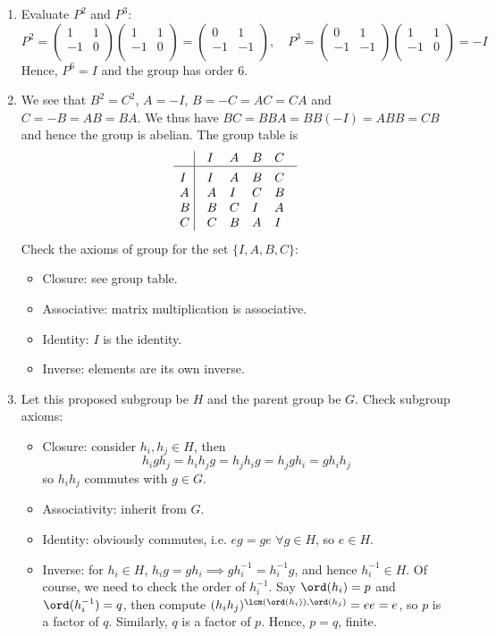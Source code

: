 \documentclass[a4paper]{article}
\begin{document}
\begin{ans}\leavevmode
\begin{enumerate}[label=(\alph*)]
\item Evaluate $P^2$ and $P^3$:
$$P^2=\begin{pmatrix}1&1\\-1&0\\\end{pmatrix}\begin{pmatrix}1&1\\-1&0\\\end{pmatrix}=\begin{pmatrix}0&1\\-1&-1\\\end{pmatrix},\quad P^3=\begin{pmatrix}0&1\\-1&-1\\\end{pmatrix}\begin{pmatrix}1&1\\-1&0\\\end{pmatrix}=-I$$
Hence, $P^6=I$ and the group has order 6.
\item We see that $B^2=C^2$, $A=-I$, $B=-C=AC=CA$ and $C=-B=AB=BA$. We thus have $BC=BBA=BB(-I)=ABB=CB$ and hence the group is abelian. The group table is
$$\vbox{\tabskip0.5em\offinterlineskip
    \halign{\strut$#$\hfil\ \tabskip1em\vrule&&$#$\hfil\cr
    ~&I&A&B&C   \cr
    \noalign{\hrule}\vrule height 12pt width 0pt
     I&I&A&B&C    \cr
     A&A&I&C&B    \cr
     B & B &C  & I & A  \cr
     C & C & B & A & I\cr
}}$$
Check the axioms of group for the set $\{I,A,B,C\}$:
\begin{itemize}
    \item Closure: see group table.
    \item Associative: matrix multiplication is associative.
    \item Identity: $I$ is the identity.
    \item Inverse: elements are its own inverse.
\end{itemize}
\item Let this proposed subgroup be $H$ and the parent group be $G$. Check subgroup axioms:
\begin{itemize}
    \item Closure: consider $h_i,h_j\in H$, then
    $$h_igh_j=h_ih_jg=h_jh_ig=h_jgh_i=gh_ih_j$$
    so $h_ih_j$ commutes with $g\in G$.
    \item Associativity: inherit from $G$.
    \item Identity: obviously commutes, i.e. $eg=ge$ $\forall g\in H$, so $e\in H$.
    \item Inverse: for $h_i\in H$, $h_ig=gh_i\implies gh_i^{-1}=h_i^{-1}g$, and hence $h_i^{-1}\in H$. Of course, we need to check the order of $h_i^{-1}$. Say $\ord(h_i)=p$ and $\ord(h_i^{-1})=q$, then compute $(h_ih_j)^{\lcm(\ord(h_i)),\ord(h_j)}=ee=e$, so $p$ is a factor of $q$. Similarly, $q$ is a factor of $p$. Hence, $p=q$, finite.
\end{itemize}



\end{enumerate}
\end{ans}
\end{document}
